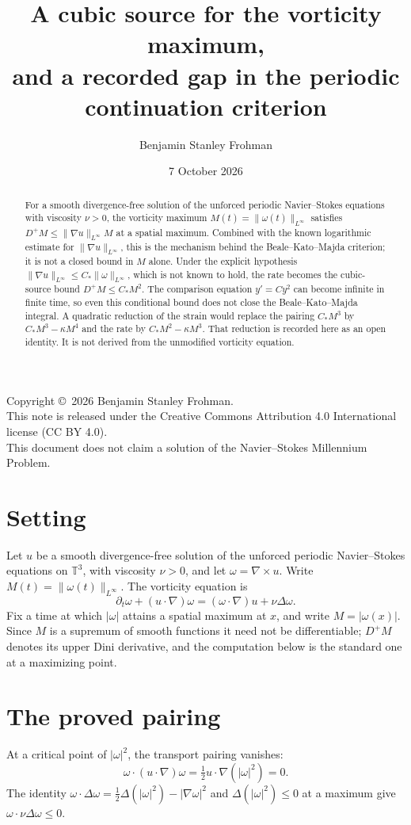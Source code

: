 \documentclass[11pt]{article}
\title{A cubic source for the vorticity maximum,\\ and a recorded gap in the periodic continuation criterion}
\author{Benjamin Stanley Frohman}
\date{7 October 2026}
\theoremstyle{definition}
\theoremstyle{remark}
\begin{document}
\maketitle
\begin{center}
Copyright \copyright\ 2026 Benjamin Stanley Frohman.\\
This note is released under the Creative Commons Attribution 4.0 International license (CC BY 4.0).\\
This document does not claim a solution of the Navier--Stokes Millennium Problem.
\end{center}

\begin{abstract}
For a smooth divergence-free solution of the unforced periodic Navier--Stokes equations with viscosity $\nu>0$, the vorticity maximum $M(t)=\|\omega(t)\|_{L^\infty}$ satisfies $D^+M\le\|\nabla u\|_{L^\infty}M$ at a spatial maximum. Combined with the known logarithmic estimate for $\|\nabla u\|_{L^\infty}$, this is the mechanism behind the Beale--Kato--Majda criterion; it is not a closed bound in $M$ alone. Under the explicit hypothesis $\|\nabla u\|_{L^\infty}\le C_*\|\omega\|_{L^\infty}$, which is not known to hold, the rate becomes the cubic-source bound $D^+M\le C_* M^2$. The comparison equation $y'=C y^2$ can become infinite in finite time, so even this conditional bound does not close the Beale--Kato--Majda integral. A quadratic reduction of the strain would replace the pairing $C_* M^3$ by $C_* M^3-\kappa M^4$ and the rate by $C_* M^2-\kappa M^3$. That reduction is recorded here as an open identity. It is not derived from the unmodified vorticity equation.
\end{abstract}

\section{Setting}
Let $u$ be a smooth divergence-free solution of the unforced periodic Navier--Stokes equations on $\mathbb{T}^3$, with viscosity $\nu>0$, and let $\omega=\nabla\times u$. Write $M(t)=\|\omega(t)\|_{L^\infty}$. The vorticity equation is
\[
\partial_t\omega+(u\cdot\nabla)\omega=(\omega\cdot\nabla)u+\nu\Delta\omega.
\]
Fix a time at which $|\omega|$ attains a spatial maximum at $x$, and write $M=|\omega(x)|$. Since $M$ is a supremum of smooth functions it need not be differentiable; $D^+M$ denotes its upper Dini derivative, and the computation below is the standard one at a maximizing point.

\section{The proved pairing}
At a critical point of $|\omega|^2$, the transport pairing vanishes:
\[
\omega\cdot(u\cdot\nabla)\omega=\tfrac12 u\cdot\nabla(|\omega|^2)=0.
\]
The identity $\omega\cdot\Delta\omega=\tfrac12\Delta(|\omega|^2)-|\nabla\omega|^2$ and $\Delta(|\omega|^2)\le 0$ at a maximum give $\omega\cdot\nu\Delta\omega\le 0$.
\end{document}
